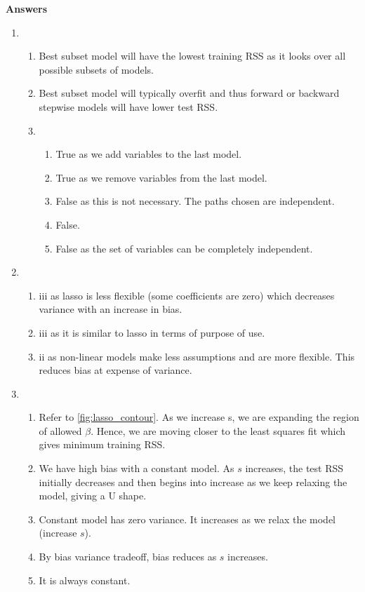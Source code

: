 \documentclass[../statistical_learning_notes.tex]{subfiles}
\begin{document}
    \textbf{Answers}
    \newline
    \begin{enumerate}
        \item
        \begin{enumerate}
            \item Best subset model will have the lowest training RSS as it looks over all possible subsets of models.
            \item Best subset model will typically overfit and thus forward or backward stepwise models will have lower test RSS.
            \item
            \begin{enumerate}
                \item True as we add variables to the last model.
                \item True as we remove variables from the last model.
                \item False as this is not necessary. The paths chosen are independent.
                \item False.
                \item False as the set of variables can be completely independent.
            \end{enumerate}
        \end{enumerate}

        \item
        \begin{enumerate}
            \item iii as lasso is less flexible (some coefficients are zero) which decreases variance with an increase in bias.
            \item iii as it is similar to lasso in terms of purpose of use.
            \item ii as non-linear models make less assumptions and are more flexible. This reduces bias at expense of variance.
        \end{enumerate}
        
        \item
        \begin{enumerate}
            \item Refer to \ref{fig:lasso_contour}. As we increase s, we are expanding the region of allowed $\beta$. Hence, we are moving closer to the least squares fit which gives minimum training RSS.
            \item We have high bias with a constant model. As $s$ increases, the test RSS initially decreases and then begins into increase as we keep relaxing the model, giving a U shape.
            \item Constant model has zero variance. It increases as we relax the model (increase $s$).
            \item By bias variance tradeoff, bias reduces as $s$ increases.
            \item It is always constant.
        \end{enumerate}


\end{enumerate}
\end{document}

